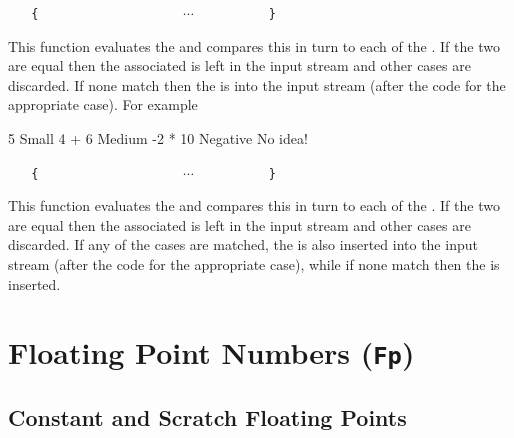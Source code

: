 \documentclass[oneside]{book}
\begin{document}
\begin{function}{\IntCaseF}
\begin{syntax}
 
~ ~ \verb|{|
~ ~ ~ ~  
~ ~ ~ ~  
~ ~ ~ ~ $\cdots$
~ ~ ~ ~  
~ ~ \verb|}|
~ ~ 
\end{syntax}
This function evaluates the  and
compares this in turn to each of the
. If the two are equal then the
associated  is left in the input stream
and other cases are discarded. If none
match then the  is into the input stream 
(after the code for the appropriate case).
For example
\begin{demohigh}
\IgnoreSpacesOn
{}
  {
    { 5 }       { Small }
    { 4 + 6 }   { Medium }
    { -2 * 10 } { Negative }
  }
  { No idea! }
\IgnoreSpacesOff
\end{demohigh}
\end{function}

\begin{function}{\IntCaseTF}
\begin{syntax}
 
~ ~ \verb|{|
~ ~ ~ ~  
~ ~ ~ ~  
~ ~ ~ ~ $\cdots$
~ ~ ~ ~  
~ ~ \verb|}|
~ ~ 
~ ~ 
\end{syntax}
This function evaluates the  and
compares this in turn to each of the
. If the two are equal then the
associated  is left in the input stream
and other cases are discarded. If any of the
cases are matched, the  is also inserted into the
input stream (after the code for the appropriate case), while if none
match then the  is inserted.
\end{function}

\chapter{Floating Point Numbers (\texttt{Fp})}

\section{Constant and Scratch Floating Points}
\end{document}
